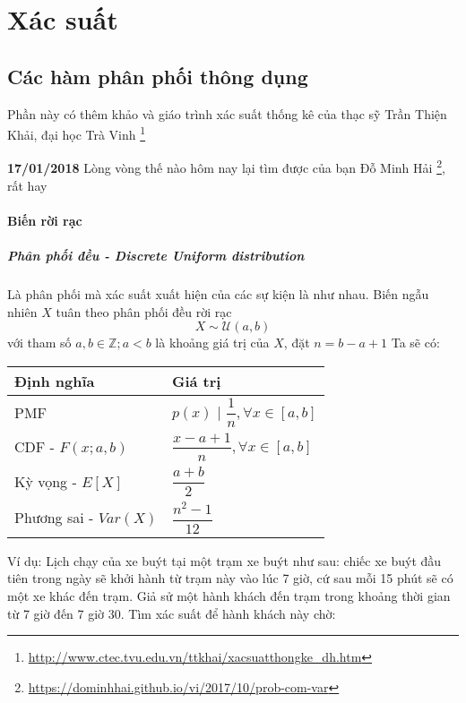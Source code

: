 \part{Xác suất}

\chapter{Các hàm phân phối thông dụng}

Phần này có thêm khảo \cite{Goodfellow-et-al-2016} và giáo trình xác suất thống kê của thạc sỹ Trần Thiện Khải, đại học Trà Vinh  \footnote{\href{http://www.ctec.tvu.edu.vn/ttkhai/xacsuatthongke_dh.htm}{http://www.ctec.tvu.edu.vn/ttkhai/xacsuatthongke\_dh.htm}}

\textbf{17/01/2018} Lòng vòng thế nào hôm nay lại tìm được của bạn Đỗ Minh Hải \footnote{\href{https://dominhhai.github.io/vi/2017/10/prob-com-var}{https://dominhhai.github.io/vi/2017/10/prob-com-var}}, rất hay

\subsection{Biến rời rạc}

\subsubsection{Phân phối đều - Discrete Uniform distribution}

Là phân phối mà xác suất xuất hiện của các sự kiện là như nhau.
\newline
Biến ngẫu nhiên $X$ tuân theo phân phối đều rời rạc
$$X \sim \mathcal{U} (a, b)$$
với tham số $a, b \in \mathbb Z; a < b$ là khoảng giá trị của $X$, đặt $n = b-a+1$
\newline
Ta sẽ có:
\newline
\begin{tabular}{ | l | l | }
  \hline
  Định nghĩa & Giá trị \\
  \hline
  PMF & $p(x)$ | $\dfrac{1}{n}, \forall x \in [a,b]$ \\
  \hline
  CDF - $F(x;a,b)$ & $\dfrac{x-a+1}{n}, \forall x \in [a,b]$ \\
  \hline
  Kỳ vọng - $E[X]$ & $\dfrac{a+b}{2}$ \\
  \hline
  Phương sai - $Var(X)$ & $\dfrac{n^2-1}{12}$ \\
  \hline
\end{tabular}
\newline
Ví dụ: Lịch chạy của xe buýt tại một trạm xe buýt như sau: chiếc xe buýt đầu tiên trong ngày sẽ khởi hành từ trạm này vào lúc 7 giờ, cứ sau mỗi 15 phút sẽ có một xe khác đến trạm. Giả sử một hành khách đến trạm trong khoảng thời gian từ 7 giờ đến 7 giờ 30. Tìm xác suất để hành khách này chờ:

